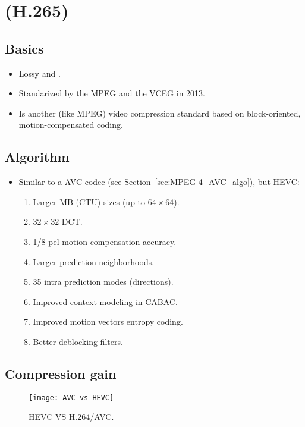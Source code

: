 \chapter{ (H.265)}
\label{cha:HEVC}

\section{Basics}
\begin{itemize}
\item Lossy and  \cite{wikipedia_HEVC}.
\item Standarized by the \gls{MPEG} and the \gls{VCEG} in 2013.
\item Is another (like \gls{MPEG}) video compression standard based on
  block-oriented, motion-compensated coding.
\end{itemize}

\section{Algorithm}
\label{sec:HEVC_algo}
\begin{itemize}
\item Similar to a \gls{AVC} codec (see Section~\ref{sec:MPEG-4_AVC_algo}),
  but \gls{HEVC}:
\begin{enumerate}
\item Larger MB (\gls{CTU}) sizes (up to $64\times 64$).
\item $32\times 32$ \gls{DCT}.
\item 1/8 pel motion compensation accuracy.
\item Larger prediction neighborhoods.
\item 35 intra prediction modes (directions).
\item Improved context modeling in \gls{CABAC}.
\item Improved motion vectors entropy coding.
\item Better deblocking filters.
\end{enumerate}
\end{itemize}

\section{Compression gain}

\begin{figure}[H]
  \vspace{+2ex}
  \centering
  \href{https://www.epiphan.com/blog/h264-vs-h265/}{\texttt{[image: AVC-vs-HEVC]}}
  \caption{\gls{HEVC} VS H.264/\gls{AVC}.}
  \label{fig:HEVC_vs_AVC}
\end{figure}

\begin{center}
\end{center}
